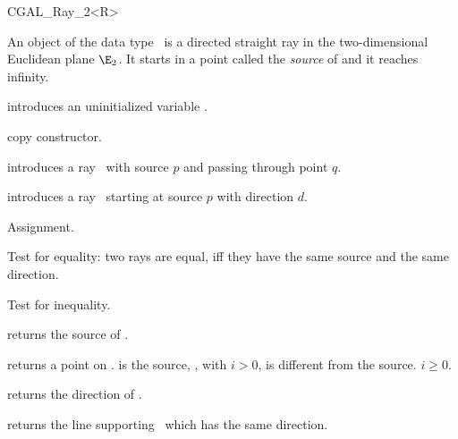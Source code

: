 
\begin{ccClassTemplate} {CGAL_Ray_2<R>}

\ccDefinition
An object  of the data type \ccClassName\ is a directed
straight ray in the two-dimensional Euclidean plane $\E_2$. It starts
in a  point called the {\em source} of   and it reaches infinity.

\ccCreation
{}


\ccHidden {}
             {introduces an uninitialized variable \ccVar.}

\ccHidden {}
            {copy constructor.}

            {introduces a ray \ccVar\ 
             with source $p$ and passing through point $q$.}

            {introduces a ray \ccVar\ starting at source $p$ with 
             direction $d$.}

\ccOperations
\ccSetTwoOfThreeColumns{5cm}{4cm}

\ccHidden {}
        {Assignment.}

       {Test for equality: two rays are equal, iff they have the same 
        source and the same direction.}

       {Test for inequality.}



       {returns the source of \ccVar.}


       {returns a point on \ccVar.  is the source,
        \ccStyle{point(i)}, with $i>0$, is different from the 
        source. \ccPrecond $i \geq 0$.}

       {returns the direction of \ccVar.}

       {returns the line supporting \ccVar\ which has the same direction.}


\end{ccClassTemplate}
